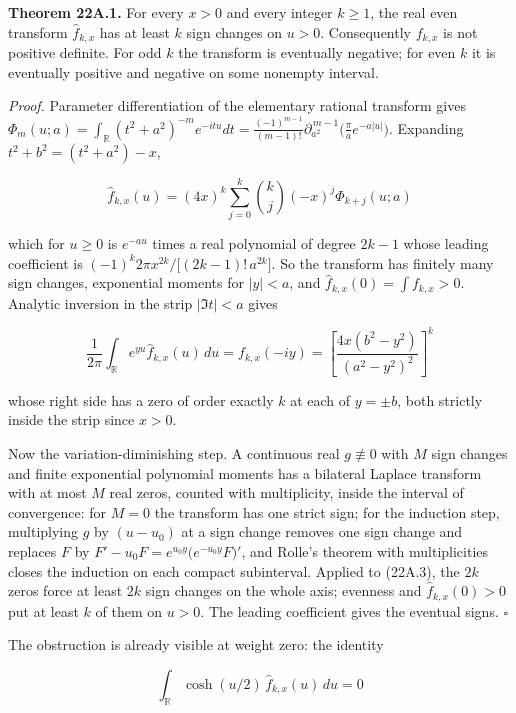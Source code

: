 \documentclass[
  11pt,
]{book}
\renewenvironment{quote}
  {\begin{tcolorbox}[
      enhanced,
      breakable,
      colback=tncream,
      colframe=tnrust,
      boxrule=0.8pt,
      arc=1.5pt,
      left=7pt,
      right=7pt,
      top=6pt,
      bottom=6pt]}
  {\end{tcolorbox}}
\begin{document}
\begin{quote}
\textbf{Theorem 22A.1.} For every \(x>0\) and every integer \(k\ge1\),
the real even transform \(\widehat f_{k,x}\) has at least \(k\) sign
changes on \(u>0\). Consequently \(f_{k,x}\) is not positive definite.
For odd \(k\) the transform is eventually negative; for even \(k\) it is
eventually positive and negative on some nonempty interval.
\end{quote}

\emph{Proof.} Parameter differentiation of the elementary rational
transform gives \(\Phi_m(u;a)=\int_{\mathbb R}(t^2+a^2)^{-m}e^{-itu}dt
=\frac{(-1)^{m-1}}{(m-1)!}\partial_{a^2}^{\,m-1}\bigl(\tfrac\pi ae^{-a|u|}\bigr)\).
Expanding \(t^2+b^2=(t^2+a^2)-x\),

\[
\widehat f_{k,x}(u)=(4x)^k\sum_{j=0}^k\binom kj(-x)^j\Phi_{k+j}(u;a)
\tag{22A.2}
\]

which for \(u\ge0\) is \(e^{-au}\) times a real polynomial of degree
\(2k-1\) whose leading coefficient is
\((-1)^k2\pi x^{2k}/\bigl[(2k-1)!\,a^{2k}\bigr]\). So the transform has
finitely many sign changes, exponential moments for \(|y|<a\), and
\(\widehat f_{k,x}(0)=\int f_{k,x}>0\). Analytic inversion in the strip
\(|\Im t|<a\) gives

\[
\frac1{2\pi}\int_{\mathbb R}e^{yu}\widehat f_{k,x}(u)\,du
=f_{k,x}(-iy)
=\left[\frac{4x(b^2-y^2)}{(a^2-y^2)^2}\right]^{k}
\tag{22A.3}
\]

whose right side has a zero of order exactly \(k\) at each of
\(y=\pm b\), both strictly inside the strip since \(x>0\).

Now the variation-diminishing step. A continuous real \(g\not\equiv0\)
with \(M\) sign changes and finite exponential polynomial moments has a
bilateral Laplace transform with at most \(M\) real zeros, counted with
multiplicity, inside the interval of convergence: for \(M=0\) the
transform has one strict sign; for the induction step, multiplying \(g\)
by \((u-u_0)\) at a sign change removes one sign change and replaces
\(F\) by \(F'-u_0F=e^{u_0y}\bigl(e^{-u_0y}F\bigr)'\), and Rolle's
theorem with multiplicities closes the induction on each compact
subinterval. Applied to (22A.3), the \(2k\) zeros force at least \(2k\)
sign changes on the whole axis; evenness and \(\widehat f_{k,x}(0)>0\)
put at least \(k\) of them on \(u>0\). The leading coefficient gives the
eventual signs. \(\square\)

The obstruction is already visible at weight zero: the identity

\[
\boxed{\ \int_{\mathbb R}\cosh(u/2)\,\widehat f_{k,x}(u)\,du=0\ }
\tag{22A.4}
\]
\end{document}
